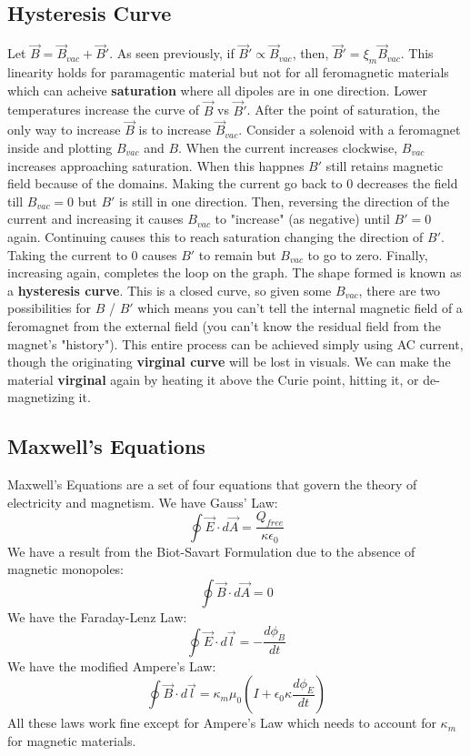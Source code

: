 \documentclass{article}
\begin{document}
\subsection{Hysteresis Curve}
Let $\vec{B}=\vec{B}_{vac}+\vec{B}'$. As seen previously,
if $\vec{B}'\propto\vec{B}_{vac}$, then, $\vec{B}'=\xi_{m}\vec{B}_{vac}$. This linearity holds for paramagentic material
but not for all feromagnetic materials which can acheive \textbf{saturation} where all dipoles are in one direction.
Lower temperatures increase the curve of $\vec{B}$ vs $\vec{B}'$. After the point of saturation, the only way to increase $\vec{B}$
is to increase $\vec{B}_{vac}$. Consider a solenoid with a feromagnet inside and plotting $B_{vac}$ and $B$.
When the current increases clockwise, $B_{vac}$ increases approaching saturation. When this happnes $B'$ still retains magnetic field
because of the domains. Making the current go back to $0$ decreases the field till $B_{vac}=0$ but $B'$ is still in one direction.
Then, reversing the direction of the current and increasing it causes $B_{vac}$ to "increase" (as negative) until $B'=0$ again.
Continuing causes this to reach saturation changing the direction of $B'$. Taking the current to $0$ causes $B'$ to remain but $B_{vac}$
to go to zero. Finally, increasing again, completes the loop on the graph. The shape formed is known as a \textbf{hysteresis curve}.
This is a closed curve, so given some $B_{vac}$, there are two possibilities for $B$ / $B'$ which means you can't tell the internal 
magnetic field of a feromagnet from the external field (you can't know the residual field from the magnet's "history").
This entire process can be achieved simply using AC current, though the originating \textbf{virginal curve} will be lost in visuals.
We can make the material \textbf{virginal} again by heating it above the Curie point, hitting it, or de-magnetizing it.

\subsection{Maxwell's Equations}
Maxwell's Equations are a set of four equations that govern the theory of electricity and magnetism.
We have Gauss' Law:
$$\oint \vec{E}\cdot d\vec{A}=\frac{Q_{free}}{\kappa \epsilon_{0}}$$
We have a result from the Biot-Savart Formulation due to the absence of magnetic monopoles:
$$\oint\vec{B}\cdot d\vec{A}=0$$
We have the Faraday-Lenz Law:
$$\oint \vec{E}\cdot d\vec{l}=-\frac{d\phi_{B}}{dt}$$
We have the modified Ampere's Law:
$$\oint \vec{B}\cdot d\vec{l}=\kappa_{m}\mu_{0}\left(I+\epsilon_{0}\kappa\frac{d\phi_{E}}{dt}\right)$$
All these laws work fine except for Ampere's Law which needs to account for $\kappa_{m}$
for magnetic materials.
\end{document}

